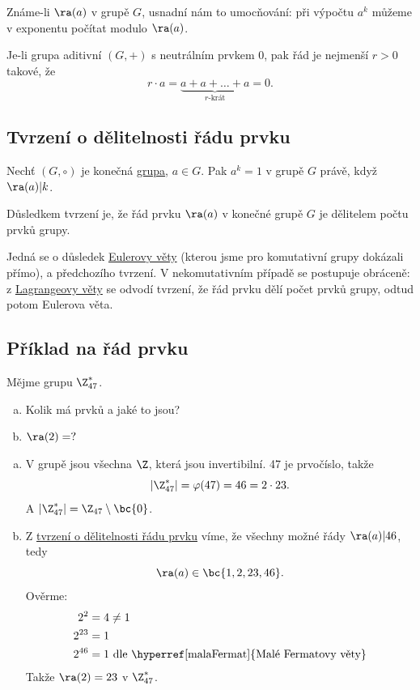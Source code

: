 Známe-li $\ra(a)$ v grupě $G$, usnadní nám to umocňování: při výpočtu $a^k$ můžeme v exponentu počítat modulo $\ra(a)$. 

Je-li grupa aditivní $(G, +)$ s neutrálním prvkem 0, pak řád je nejmenší $r>0$ takové, že
\begin{equation}
	r \cdot a = \underbrace{a + a + \dots + a}_{r\text{-krát}} = 0.
\end{equation}

\subsection{Tvrzení o dělitelnosti řádu prvku}\label{tvrDelRad}
Nechť $(G, \circ)$ je konečná \hyperref[grupa]{grupa}, $a \in G$. Pak $a^k = 1$ v grupě $G$ právě, když $\ra(a) |k$. 

Důsledkem tvrzení je, že řád prvku $\ra(a)$ v konečné grupě $G$ je dělitelem počtu prvků grupy.

Jedná se o důsledek \hyperref[euler]{Eulerovy věty} (kterou jsme pro komutativní grupy dokázali přímo), a předchozího tvrzení. V nekomutativním případě se postupuje obráceně: z \hyperref[lagrange]{Lagrangeovy věty} se odvodí tvrzení, že řád prvku dělí počet prvků grupy, odtud potom Eulerova věta.

\subsection{Příklad na řád prvku}
Mějme grupu $\Z_{47}^*$.
\begin{enumerate}[a)]
	\item Kolik má prvků a jaké to jsou?
	\item $\ra(2) = ?$ 
\end{enumerate}
\begin{enumerate}[a)]
	\item V grupě jsou všechna $\Z$, která jsou invertibilní. 47 je prvočíslo, takže
	\begin{equation}
		| \Z_{47}^* | = \varphi(47) = 46 = 2 \cdot 23.
	\end{equation}
	A $|\Z_{47}^* | = \Z_{47} \setminus \bc{0}$.
	\item Z \hyperref[tvrDelRad]{tvrzení o dělitelnosti řádu prvku} víme, že všechny možné řády $\ra(a) | 46$, tedy
	\begin{equation}
		\ra(a) \in \bc{1, 2, 23, 46}.
	\end{equation}
	Ověrme:
	\begin{align}
		2^2 &= 4 \not= 1 \\
		2^{23} &= 1\\
		2^{46} &= 1 \text{ dle \hyperref[malaFermat]{Malé Fermatovy věty}}
	\end{align}
	Takže $\ra(2) = 23$ v $\Z_{47}^*$.
\end{enumerate}

